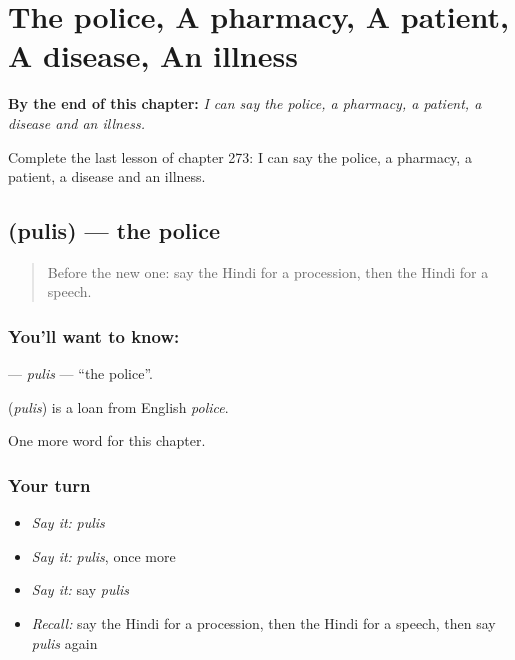 
\chapter{The police, A pharmacy, A patient, A disease, An illness}
\label{ch:hi-the-police-a-pharmacy-a-patient-a-disease-an-illness}

\begin{chapteropening}
\textbf{By the end of this chapter:} \emph{I can say the police, a pharmacy, a patient, a disease and an illness.}

Complete the last lesson of chapter 273: I can say the police, a pharmacy, a patient, a disease and an illness.
\end{chapteropening}

\section[\texorpdfstring{\hi{पुलिस} (pulis)}{पुलिस (pulis)}]{ (pulis) — the police}

\label{lesson:HI-C273-pulis}



\begin{quote}
Before the new one: say the Hindi for a procession, then the Hindi for a speech.
\end{quote}

\subsection*{You'll want to know: }
\textbf{} — \emph{pulis} — \textquotedblleft{}the police\textquotedblright{}.

\begin{cousinweb}
\textbf{} (\emph{pulis}) is a loan from English \emph{police}.
\end{cousinweb}

\begin{grammarlens}[title={What you've built}]
One more word for this chapter.
\end{grammarlens}

\subsection*{Your turn}
\begin{itemize}
\raggedright
  \item \emph{Say it:} \emph{pulis}
  \item \emph{Say it:} \emph{pulis}, once more
  \item \emph{Say it:} say \emph{pulis}
  \item \emph{Recall:} say the Hindi for a procession, then the Hindi for a speech, then say \emph{pulis} again
\end{itemize}

